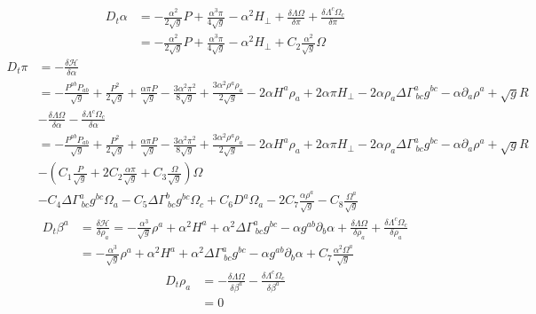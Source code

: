 \documentclass{article}
\begin{document}
\begin{align*}
D_{t}\alpha & = - \frac{\alpha^{2}}{2\sqrt{g}}P + \frac{\alpha^{3}\pi}{4\sqrt{g}} - \alpha^{2}H_{\perp} + \frac{\delta \Lambda \Omega}{\delta \pi} + \frac{\delta \Lambda^{c}\Omega_{c}}{\delta \pi}\\
& = - \frac{\alpha^{2}}{2\sqrt{g}}P + \frac{\alpha^{3}\pi}{4\sqrt{g}} - \alpha^{2}H_{\perp} + C_{2}\frac{\alpha^{2}}{\sqrt{g}}\Omega 
\end{align*}
\begin{align*}
D_{t}\pi & = -\frac{\delta \mathscr{H}}{\delta \alpha}\\
& = - \frac{P^{ab}P_{ab}}{\sqrt{g}} + \frac{P^{2}}{2\sqrt{g}} + \frac{\alpha \pi P}{\sqrt{g}} - \frac{3\alpha^{2}\pi^{2}}{8\sqrt{g}} + \frac{3\alpha^{2}\rho^{a}\rho_{a}}{2\sqrt{g}}- 2\alpha H^{a}\rho_{a} + 2\alpha \pi H_{\perp} - 2\alpha\rho_{a}\Delta \Gamma^{a}_{~bc}g^{bc} - \alpha \partial_{a}\rho^{a} + \sqrt{g}R\\
& - \frac{\delta \Lambda \Omega}{\delta \alpha} - \frac{\delta \Lambda^{c}\Omega_{c}}{\delta \alpha}\\
& = - \frac{P^{ab}P_{ab}}{\sqrt{g}} + \frac{P^{2}}{2\sqrt{g}} + \frac{\alpha \pi P}{\sqrt{g}} - \frac{3\alpha^{2}\pi^{2}}{8\sqrt{g}} + \frac{3\alpha^{2}\rho^{a}\rho_{a}}{2\sqrt{g}}- 2\alpha H^{a}\rho_{a} + 2\alpha \pi H_{\perp} - 2\alpha\rho_{a}\Delta \Gamma^{a}_{~bc}g^{bc} - \alpha \partial_{a}\rho^{a} + \sqrt{g}R\\
& - \left(C_{1}\frac{P}{\sqrt{g}} + 2C_{2}\frac{\alpha \pi}{\sqrt{g}} + C_{3}\frac{\Omega}{\sqrt{g}}\right)\Omega\\
&  - C_{4}\Delta \Gamma^{a}_{~bc}g^{bc}\Omega_{a} - C_{5}\Delta \Gamma^{b}_{~bc}g^{bc}\Omega_{c} + C_{6}D^{a}\Omega_{a} - 2C_{7}\frac{\alpha \rho^{a}}{\sqrt{g}} - C_{8}\frac{\Omega^{a}}{\sqrt{g}}
\end{align*}
\begin{align*}
D_{t}\beta^{a} & = \frac{\delta \mathscr{H}}{\delta \rho_{a}} = -\frac{\alpha^{3}}{\sqrt{g}}\rho^{a} + \alpha^{2}H^{a} + \alpha^{2}\Delta \Gamma^{a}_{~bc}g^{bc} - \alpha g^{ab}\partial_{b}\alpha + \frac{\delta \Lambda \Omega}{\delta \rho_{a}} + \frac{\delta \Lambda^{c}\Omega_{c}}{\delta \rho_{a}}\\
&  = -\frac{\alpha^{3}}{\sqrt{g}}\rho^{a} + \alpha^{2}H^{a} + \alpha^{2}\Delta \Gamma^{a}_{~bc}g^{bc} - \alpha g^{ab}\partial_{b}\alpha + C_{7}\frac{\alpha^{2}\Omega^{a}}{\sqrt{g}}
\end{align*}
\begin{align*}
D_{t}\rho_{a} & = - \frac{\delta \Lambda \Omega}{\delta \beta^{a}} - \frac{\delta \Lambda^{c}\Omega_{c}}{\delta \beta^{a}}\\
& = 0
\end{align*}
\end{document}
